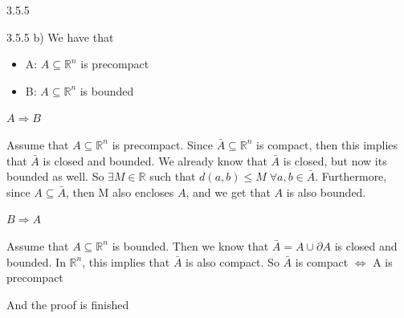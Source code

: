 \documentclass[a4paper,norsk]{article}
\renewcommand{\leq}{\leqslant}
\begin{document}
\begin{oppgavebox}{3.5.5 }{}
\begin{itemize}
  \begin{proofbox}{3.5.5 b)}{}
    We have that 
    \begin{itemize}
      \item A: $ A \subseteq \mathbb{R}^n $ is precompact
      \item B: $ A \subseteq \mathbb{R}^n $ is bounded
    \end{itemize}


    $ A \Rightarrow B $ 

    Assume that $ A \subseteq \mathbb{R}^n$ is precompact.  Since $ \bar{A} \subseteq \mathbb{R}^n $ is compact, then this implies that $ \bar{A} $ is closed and bounded. We already know that $ \bar{A} $ is closed, but now its bounded as well. So $ \exists M \in \mathbb{R} $ such that $ d \left( a, b \right) \leq M \; \forall a, b \in  \bar{A} $. Furthermore, since $ A \subseteq \bar{A} $, then M also encloses $ A $, and we get that $ A $ is also bounded. 



    $ B \Rightarrow A $
    
    Assume that $ A \subseteq \mathbb{R}^n $ is bounded. Then we know that $ \bar{A} = A \cup \partial A $ is closed and bounded. In $ \mathbb{R}^n $, this implies that $ \bar{A} $ is also compact.  So $ \bar{A} $ is compact $ \iff $ A is precompact
    
    And the proof is finished

  \end{proofbox}
\end{itemize}
\end{oppgavebox}
\end{document}
